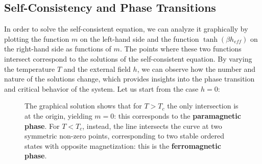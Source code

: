 \subsection{Self-Consistency and Phase Transitions}

In order to solve the self-consistent equation, we can analyze it graphically by plotting the function \(m\) on the left-hand side and the function \(\tanh\left( \beta h_{eff} \right)\) on the right-hand side as functions of \(m\). The points where these two functions intersect correspond to the solutions of the self-consistent equation. By varying the temperature \(T\) and the external field \(h\), we can observe how the number and nature of the solutions change, which provides insights into the phase transition and critical behavior of the system. Let us start from the case \(h=0\):
\begin{figure}[H]
    \begin{minipage}{0.6\textwidth}
        \centering
    \end{minipage}
    \hfill
    \begin{minipage}{0.35\textwidth}
        The graphical solution shows that for \(T > T_c\) the only intersection is at the origin, yielding \(m=0\): this corresponds to the \textbf{paramagnetic phase}. For \(T < T_c\), instead, the line intersects the curve at two symmetric non-zero points, corresponding to two stable ordered states with opposite magnetization: this is the \textbf{ferromagnetic phase}.
    \end{minipage}
\end{figure}
